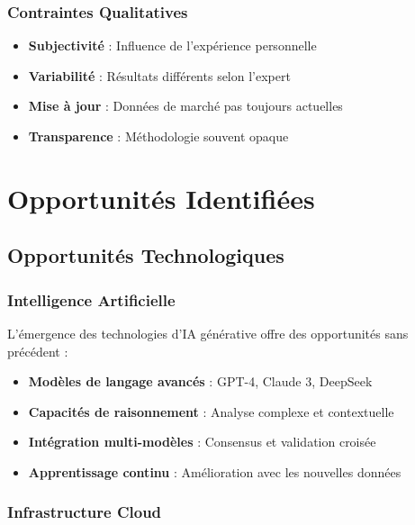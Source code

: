 \subsubsection{Contraintes Qualitatives}

\begin{itemize}
    \item \textbf{Subjectivité} : Influence de l'expérience personnelle
    \item \textbf{Variabilité} : Résultats différents selon l'expert
    \item \textbf{Mise à jour} : Données de marché pas toujours actuelles
    \item \textbf{Transparence} : Méthodologie souvent opaque
\end{itemize}

\section{Opportunités Identifiées}
\label{sec:opportunites}

\subsection{Opportunités Technologiques}
\label{subsec:opportunites_tech}

\subsubsection{Intelligence Artificielle}

L'émergence des technologies d'IA générative offre des opportunités sans précédent :

\begin{itemize}
    \item \textbf{Modèles de langage avancés} : GPT-4, Claude 3, DeepSeek
    \item \textbf{Capacités de raisonnement} : Analyse complexe et contextuelle
    \item \textbf{Intégration multi-modèles} : Consensus et validation croisée
    \item \textbf{Apprentissage continu} : Amélioration avec les nouvelles données
\end{itemize}

\subsubsection{Infrastructure Cloud}

